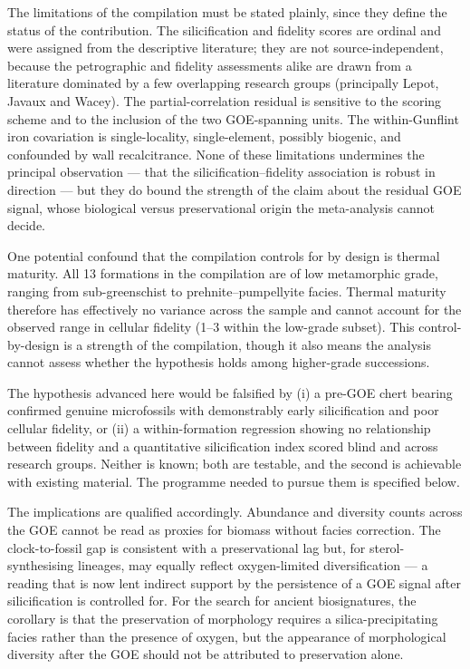 \documentclass[11pt]{article}
\begin{document}
The limitations of the compilation must be stated plainly, since they define the status of the
contribution. The silicification and fidelity scores are ordinal and were assigned from the
descriptive literature; they are not source-independent, because the petrographic and fidelity
assessments alike are drawn from a literature dominated by a few overlapping research groups
(principally Lepot, Javaux and Wacey). The partial-correlation residual is sensitive to the scoring
scheme and to the inclusion of the two GOE-spanning units. The within-Gunflint iron covariation is
single-locality, single-element, possibly biogenic, and confounded by wall recalcitrance. None of
these limitations undermines the principal observation --- that the silicification--fidelity
association is robust in direction --- but they do bound the strength of the claim about the residual
GOE signal, whose biological
versus preservational origin the meta-analysis cannot decide.

One potential confound that the compilation controls for by design is thermal maturity. All 13
formations in the compilation are of low metamorphic grade, ranging from sub-greenschist to
prehnite--pumpellyite facies. Thermal maturity therefore has effectively no variance across the
sample and cannot account for the observed range in cellular fidelity (1--3 within the low-grade
subset). This control-by-design is a strength of the compilation, though it also means the analysis
cannot assess whether the hypothesis holds among higher-grade successions.

The hypothesis advanced here would be falsified by (i) a pre-GOE chert bearing confirmed genuine
microfossils with demonstrably early silicification and poor cellular fidelity, or (ii) a
within-formation regression showing no relationship between fidelity and a quantitative
silicification index scored blind and across research groups. Neither is known; both are testable,
and the second is achievable with existing material. The programme needed to pursue them is
specified below.

The implications are qualified accordingly. Abundance and diversity counts across the GOE cannot be
read as proxies for biomass without facies correction. The clock-to-fossil gap is consistent with a
preservational lag but, for sterol-synthesising lineages, may equally reflect oxygen-limited
diversification --- a reading that is now lent indirect support by the persistence of a GOE signal
after silicification is controlled for. For the search for ancient biosignatures, the corollary is
that the preservation of morphology requires a silica-precipitating facies rather than the presence
of oxygen, but the appearance of morphological diversity after the GOE should not be attributed to
preservation alone.
\end{document}
